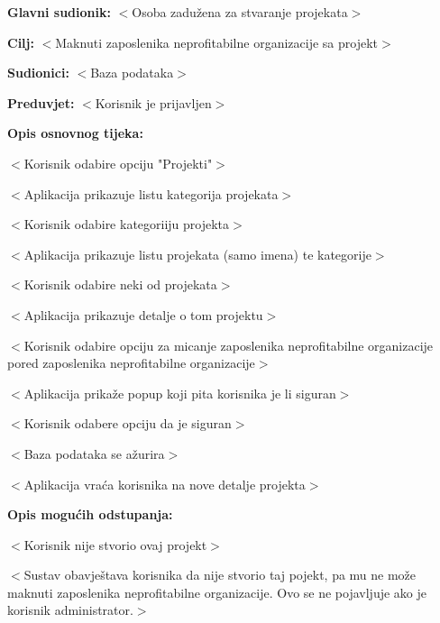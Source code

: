 					\begin{packed_item}

						\item \textbf{Glavni sudionik: }$<$Osoba zadužena za stvaranje projekata$>$
						\item  \textbf{Cilj:} $<$Maknuti zaposlenika neprofitabilne organizacije sa projekt$>$
						\item  \textbf{Sudionici:} $<$Baza podataka$>$
						\item  \textbf{Preduvjet:} $<$Korisnik je prijavljen$>$
						\item  \textbf{Opis osnovnog tijeka:}

						\item[] \begin{packed_enum}

							\item $<$Korisnik odabire opciju "Projekti"$>$
							\item $<$Aplikacija prikazuje listu kategorija projekata$>$
							\item $<$Korisnik odabire kategoriiju projekta$>$
							\item $<$Aplikacija prikazuje listu projekata (samo imena) te kategorije$>$
							\item $<$Korisnik odabire neki od projekata$>$
							\item $<$Aplikacija prikazuje detalje o tom projektu$>$
							\item $<$Korisnik odabire opciju za micanje zaposlenika neprofitabilne organizacije pored
							zaposlenika neprofitabilne organizacije$>$
							\item $<$Aplikacija prikaže popup koji pita korisnika je li siguran$>$
							\item $<$Korisnik odabere opciju da je siguran$>$
							\item $<$Baza podataka se ažurira$>$
							\item $<$Aplikacija vraća korisnika na nove detalje projekta$>$
						\end{packed_enum}

						\item  \textbf{Opis mogućih odstupanja:}

						\item[] \begin{packed_item}

							\item[7.a] $<$Korisnik nije stvorio ovaj projekt$>$
							\item[] \begin{packed_enum}

								\item $<$Sustav obavještava korisnika da nije stvorio taj pojekt, pa mu
								ne može maknuti zaposlenika neprofitabilne organizacije.
								Ovo se ne pojavljuje ako je korisnik administrator.$>$

							\end{packed_enum}

						\end{packed_item}
					\end{packed_item}

